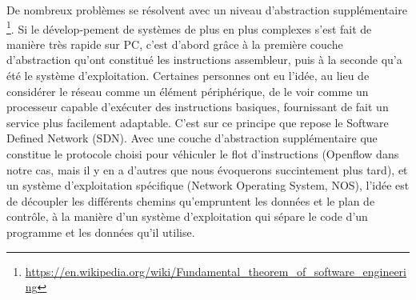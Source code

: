 De nombreux problèmes se résolvent avec un niveau d'abstraction supplémentaire \footnote{\label{indirection}\url{https://en.wikipedia.org/wiki/Fundamental_theorem_of_software_engineering}}. Si le dévelop-pement de systèmes de plus en plus complexes s'est fait de manière très rapide sur PC, c'est d'abord grâce à la première couche d'abstraction qu'ont constitué les instructions assembleur, puis à la seconde qu'a été le système d'exploitation. Certaines personnes ont eu l'idée, au lieu de considérer le réseau comme un élément périphérique, de le voir comme un processeur capable d'exécuter des instructions basiques, fournissant de fait un service plus facilement adaptable. C'est sur ce principe que repose le Software Defined Network (SDN). Avec une couche d'abstraction supplémentaire que constitue le protocole choisi pour véhiculer le flot d'instructions (Openflow dans notre cas, mais il y en a d'autres que nous évoquerons succintement plus tard), et un système d'exploitation spécifique (Network Operating System, NOS), l'idée est de découpler les différents chemins qu'empruntent les données et le plan de contrôle, à la manière d'un système d'exploitation qui sépare le code d'un programme et les données qu'il utilise.